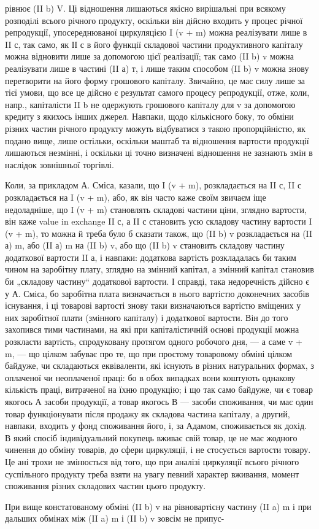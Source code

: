 рівнює (II b) V. Ці відношення лишаються якісно вирішальні при всякому
розподілі всього річного продукту, оскільки він дійсно входить у процес
річної репродукції, упосереднюваної циркуляцією I (v + m) можна реалізувати
лише в II с, так само, як ІІ с в його функції складової частини
продуктивного капіталу можна відновити лише за допомогою цієї реалізації;
так само (II b) v можна реалізувати лише в частині (II а) т, і лише
таким способом (II b) v можна знову перетворити на його форму грошового
капіталу. Звичайно, це має силу лише за тієї умови, що все це дійсно
є результат самого процесу репродукції, отже, коли, напр., капіталісти
II b не одержують грошового капіталу для v за допомогою кредиту з
якихось інших джерел. Навпаки, щодо кількісного боку, то обміни різних
частин річного продукту можуть відбуватися з такою пропорційністю, як
подано вище, лише остільки, оскільки маштаб та відношення вартости
продукції лишаються незмінні, і оскільки ці точно визначені відношення
не зазнають змін в наслідок зовнішньої торгівлі.

Коли, за прикладом А. Сміса, казали, що I (v + m), розкладається на
II с, II с розкладається на I (v + m), або, як він часто каже своїм
звичаєм іще недоладніше, що I (v + m) становлять складові частини ціни,
зглядно вартости, він каже value in exchange II с, а II с становить усю
складову частину вартости I (v + m), то можна й треба було б сказати
також, що (II b) v розкладається на (II а) m, або (II а) m на (II b) v,
або що (II b) v становить складову частину додаткової вартости II а, і
навпаки: додаткова вартість розкладалась би таким чином на заробітну
плату, зглядно на змінний капітал, а змінний капітал становив би „складову
частину“ додаткової вартости. І справді, така недоречність дійсно
є у А. Сміса, бо заробітна плата визначається в нього вартістю доконечних
засобів існування, і ці товарові вартості знову таки визначаються
вартістю вміщених у них заробітної плати (змінного капіталу) і додаткової
вартости. Він до того захопився тими частинами, на які при капіталістичній
основі продукції можна розкласти вартість, спродуковану протягом
одного робочого дня, — а саме v + m, — що цілком забуває про те, що при
простому товаровому обміні цілком байдуже, чи складаються еквіваленти,
які існують в різних натуральних формах, з оплаченої чи неоплаченої праці:
бо в обох випадках вони коштують однакову кількість праці, витраченої
на їхню продукцію; і що так само байдуже, чи є товар якогось А засоби
продукції, а товар якогось В — засоби споживання, чи має один
товар функціонувати після продажу як складова частина капіталу, а
другий, навпаки, входить у фонд споживання його, і, за Адамом, споживається
як дохід. В який спосіб індивідуальний покупець вживає свій
товар, це не має жодного чинення до обміну товарів, до сфери циркуляції,
і не стосується вартости товару. Це ані трохи не змінюється
від того, що при аналізі циркуляції всього річного суспільного продукту
треба взяти на увагу певний характер вживання, момент споживання
різних складових частин цього продукту.

При вище констатованому обміні (II b) v на рівновартісну частину
(II a) m і при дальших обмінах між (II a) m і (II b) v зовсім не припус-
